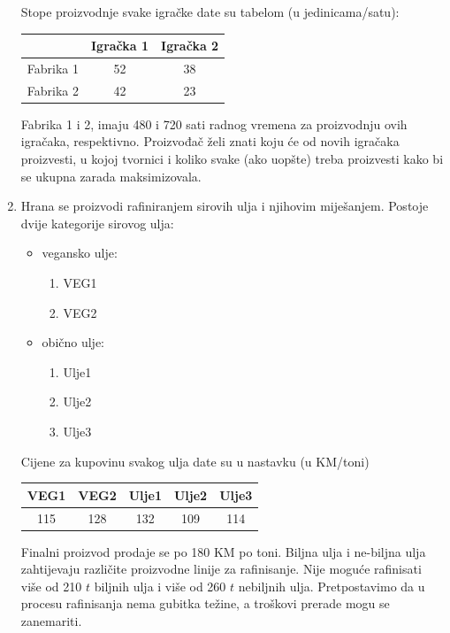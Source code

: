 \documentclass[b5paper, utf8, 11pt, colorlinks]{book}
\theoremstyle{definition}
\begin{document}
\begin{enumerate}
	
	Stope proizvodnje svake igračke date su tabelom (u jedinicama/satu): 
	\begin{table}[H]
		\centering
		\begin{tabular}{l|cc} \hline
			\        &  Igračka 1 & Igračka 2 \\ \hline
			Fabrika 1   &  52     &  38     \\
			Fabrika 2   &  42     &  23     \\	\hline
		\end{tabular} 
	\end{table}
	Fabrika 1 i 2, imaju 480 i 720 sati radnog vremena za proizvodnju ovih igračaka, respektivno. Proizvođač želi znati koju će od novih igračaka proizvesti, u kojoj tvornici i koliko svake (ako uopšte) treba proizvesti kako bi se ukupna zarada maksimizovala. 
	\item %
	Hrana se proizvodi rafiniranjem sirovih ulja i njihovim miješanjem. Postoje dvije kategorije sirovog ulja: 
	\begin{itemize}
		\item vegansko ulje:
		\begin{enumerate}
			\item VEG1
			\item VEG2 
		\end{enumerate}
		\item obično ulje:
		\begin{enumerate}
			\item Ulje1
			\item Ulje2 
			\item Ulje3
		\end{enumerate}
	\end{itemize}
	Cijene za kupovinu svakog ulja date su u nastavku (u KM/toni)
	\begin{table}[H]
		\centering
		\begin{tabular}{ccccc}
			VEG1 & VEG2 & Ulje1 & Ulje2 & Ulje3 \\ \hline
			115  & 128  & 132   & 109   & 114 \\ 	\hline	
		\end{tabular} 
	\end{table}
	Finalni proizvod prodaje se po 180 KM po toni. Biljna ulja i ne-biljna ulja zahtijevaju različite proizvodne linije za rafinisanje. Nije moguće rafinisati više od 210 $t$ biljnih ulja i više od 260 $t$ nebiljnih ulja. Pretpostavimo da u procesu rafinisanja nema gubitka težine, a troškovi prerade mogu se zanemariti. 
	

\end{enumerate}
\end{document}
